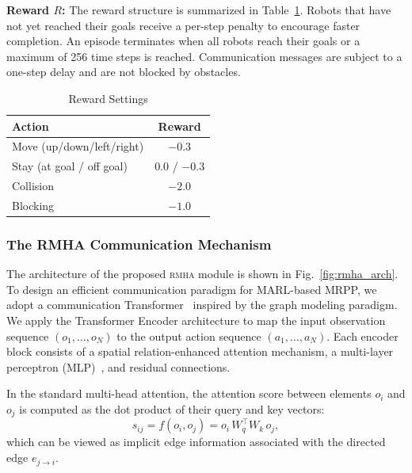 \documentclass[conference]{IEEEtran}
\newcommand{\rmha}{\textsc{rmha}}
\begin{document}
\textbf{Reward $R$:}
The reward structure is summarized in Table~\ref{tab:reward}.
Robots that have not yet reached their goals receive a per-step
penalty to encourage faster completion.
An episode terminates when all robots reach their goals or a
maximum of 256 time steps is reached.
Communication messages are subject to a one-step delay and are not
blocked by obstacles.

\begin{table}[t]
\centering
\caption{Reward Settings}
\label{tab:reward}
\begin{tabular}{lc}
\toprule
\textbf{Action} & \textbf{Reward} \\
\midrule
Move (up/down/left/right) & $-0.3$ \\
Stay (at goal / off goal) & $0.0$ / $-0.3$ \\
Collision & $-2.0$ \\
Blocking & $-1.0$ \\
\bottomrule
\end{tabular}
\end{table}

\subsubsection{The RMHA Communication Mechanism}

The architecture of the proposed \rmha{} module is shown in
Fig.~\ref{fig:rmha_arch}.
To design an efficient communication paradigm for MARL-based
MRPP, we adopt a communication
Transformer~\cite{wang2025transformer,xiong2025ropt,lee2024mission}
inspired by the graph modeling paradigm.
We apply the Transformer Encoder architecture to map the input
observation sequence $(o_1,\ldots,o_N)$ to the output action
sequence $(a_1,\ldots,a_N)$.
Each encoder block consists of a spatial relation-enhanced
attention mechanism, a multi-layer perceptron
(MLP)~\cite{aina2025mlp,wang2025mlp,ouaret2025mlp}, and residual
connections.

In the standard multi-head attention, the attention score between
elements $o_i$ and $o_j$ is computed as the dot product of their
query and key vectors:
\begin{equation}\label{eq:vanilla_attn}
  s_{ij} = f(o_i, o_j) = o_i\, W_q^\top W_k\, o_j,
\end{equation}
which can be viewed as implicit edge information associated with
the directed edge $e_{j\to i}$.
\end{document}
